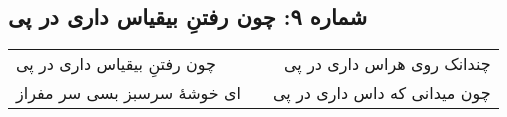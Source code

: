 \begin{center}
\section*{شماره ۹: چون رفتنِ بیقیاس داری در پی}
\label{sec:009}
\begin{longtable}{l p{0.5cm} r}
چون رفتنِ بیقیاس داری در پی
&&
چندانک روی هراس داری در پی
\\
ای خوشهٔ سرسبز بسی سر مفراز
&&
چون میدانی که داس داری در پی
\\
\end{longtable}
\end{center}

